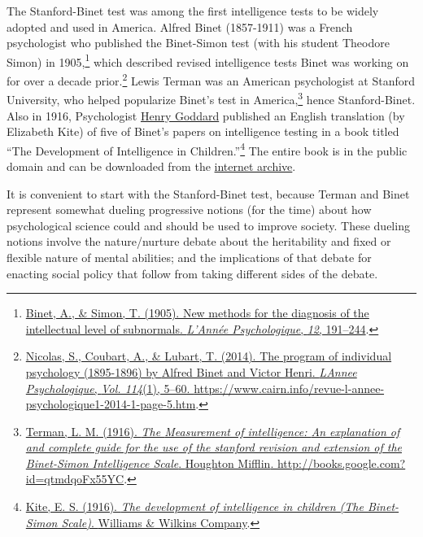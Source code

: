 \documentclass[
  oneside,
  12pt]{crumpbook}
\begin{document}
The Stanford-Binet test was among the first intelligence tests to be widely adopted and used in America. Alfred Binet (1857-1911) was a French psychologist who published the Binet-Simon test (with his student Theodore Simon) in 1905,\footnote{\protect\hyperlink{ref-binetNewMethodsDiagnosis1905}{Binet, A., \& Simon, T. (1905). New methods for the diagnosis of the intellectual level of subnormals. \emph{L'Année Psychologique}, \emph{12}, 191--244}.} which described revised intelligence tests Binet was working on for over a decade prior.\footnote{\protect\hyperlink{ref-nicolasProgramIndividualPsychology2014}{Nicolas, S., Coubart, A., \& Lubart, T. (2014). The program of individual psychology (1895-1896) by {Alfred Binet} and {Victor Henri}. \emph{LAnnee Psychologique}, \emph{Vol. 114}(1), 5--60. \url{https://www.cairn.info/revue-l-annee-psychologique1-2014-1-page-5.htm}}.} Lewis Terman was an American psychologist at Stanford University, who helped popularize Binet's test in America,\footnote{\protect\hyperlink{ref-termanMeasurementIntelligenceExplanation1916}{Terman, L. M. (1916). \emph{The {Measurement} of intelligence: {An} explanation of and complete guide for the use of the stanford revision and extension of the {Binet}-{Simon Intelligence Scale}}. {Houghton Mifflin}. \url{http://books.google.com?id=qtmdqoFx55YC}}.} hence Stanford-Binet. Also in 1916, Psychologist \href{https://en.wikipedia.org/wiki/Henry_H._Goddard}{Henry Goddard} published an English translation (by Elizabeth Kite) of five of Binet's papers on intelligence testing in a book titled ``The Development of Intelligence in Children.''\footnote{\protect\hyperlink{ref-kiteDevelopmentIntelligenceChildren1916}{Kite, E. S. (1916). \emph{The development of intelligence in children ({The Binet}-{Simon Scale})}. {Williams \& Wilkins Company}}.} The entire book is in the public domain and can be downloaded from the \href{https://archive.org}{internet archive}.

It is convenient to start with the Stanford-Binet test, because Terman and Binet represent somewhat dueling progressive notions (for the time) about how psychological science could and should be used to improve society. These dueling notions involve the nature/nurture debate about the heritability and fixed or flexible nature of mental abilities; and the implications of that debate for enacting social policy that follow from taking different sides of the debate.
\end{document}
